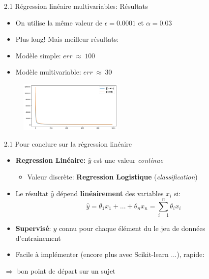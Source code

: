 \begin{frame}{2.1 Régression linéaire multivariables: Résultats}
  \begin{itemize}
  \item On utilise la même valeur de $\epsilon = 0.0001$ et $\alpha = 0.03$
  \item Plus long! Mais meilleur résultats:
  \item Modèle simple: $err ~ \approx ~ 100$
  \item Modèle multivariable: $err ~ \approx ~ 30$
  \end{itemize}
  \begin{figure}
    \includegraphics[width=0.45\textwidth]{fig/multiVarDesc.png}\\
  \end{figure}
\end{frame}
  
\begin{frame}{2.1 Pour conclure sur la régression linéaire}
  \begin{itemize}
  \item \textbf{Regression Linéaire:} $\hat{y}$ est une valeur \textit{continue}
    \begin{itemize}
      \normalsize
    \item Valeur discrète: \textbf{Regression Logistique} (\textit{classification})
    \end{itemize}
    \vspace{0.2cm}
  \item Le résultat $\hat{y}$ dépend \textbf{linéairement} des variables $x_{i}$ si:
    \begin{equation*}
      \hat{y} = \theta_{1}x_{1} + \dots + \theta_{n}x_{n} = \displaystyle\sum_{i=1}^{n} \theta_{i} x_{i}
    \end{equation*}
  \item \textbf{Supervisé}: $y$ connu pour chaque élément du le jeu de données d'entrainement
  \item Facile à implémenter (encore plus avec Scikit-learn ...), rapide: 
  \end{itemize}
  \begin{center}
    $\Rightarrow$ bon point de départ sur un sujet
  \end{center}
\end{frame}

